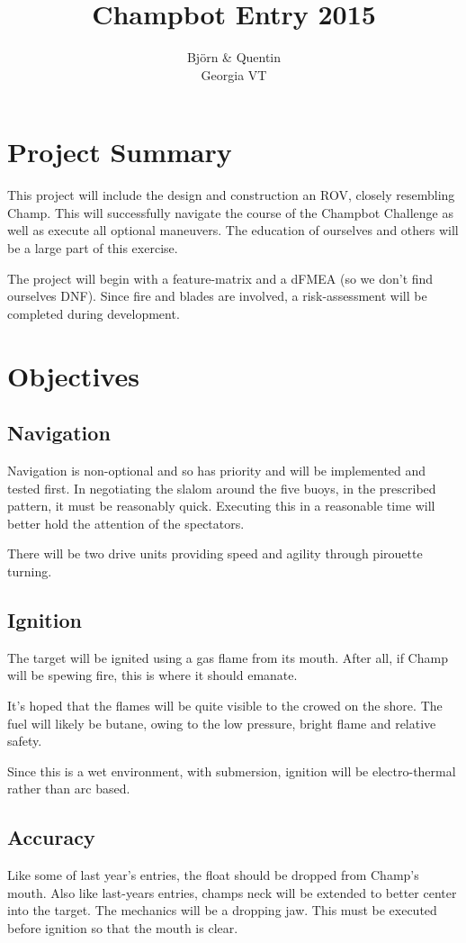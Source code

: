 \documentclass[]{article}
\title{Champbot Entry 2015}
\author{Bj{\"o}rn \& Quentin\\Georgia VT}
\begin{document}
\maketitle

\section{Project Summary}
This project will include the design and construction an ROV, closely resembling Champ.
This will successfully navigate the course of the Champbot Challenge as well as execute all optional maneuvers.
The education of ourselves and others will be a large part of this exercise.  

The project will begin with a feature-matrix and a dFMEA (so we don't find ourselves DNF).
Since fire and blades are involved, a risk-assessment will be completed during development.

\section{Objectives}
\subsection{Navigation}
Navigation is non-optional and so has priority and will be implemented and tested first.
In negotiating the slalom around the five buoys, in the prescribed pattern, it must be reasonably quick.
Executing this in a reasonable time will better hold the attention of the spectators.

There will be two drive units providing speed and agility through pirouette turning.


\subsection{Ignition}
The target will be ignited using a gas flame from its mouth.
After all, if Champ will be spewing fire, this is where it should emanate.

It's hoped that the flames will be quite visible to the crowed on the shore.
The fuel will likely be butane, owing to the low pressure, bright flame and relative safety.

Since this is a wet environment, with submersion, ignition will be electro-thermal rather than arc based.

\subsection{Accuracy}
Like some of last year's entries, the float should be dropped from Champ's mouth.
Also like last-years entries, champs neck will be extended to better center into the target.
The mechanics will be a dropping jaw. This must be executed before ignition so that the mouth is clear. 
\end{document}
